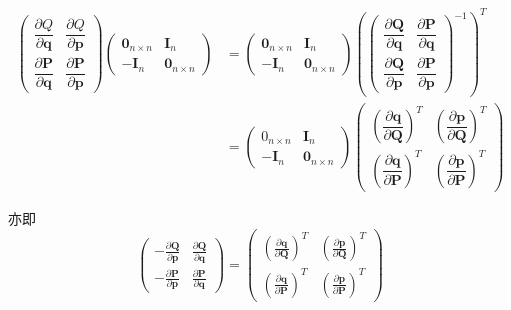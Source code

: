 \documentclass[12pt]{ctexart}
\begin{document}
\begin{equation}
\begin{aligned}\begin{pmatrix}\dfrac{\partial Q}{\partial\boldsymbol{q}}&\dfrac{\partial Q}{\partial\boldsymbol{p}}\\\dfrac{\partial\boldsymbol{P}}{\partial\boldsymbol{q}}&\dfrac{\partial\boldsymbol{P}}{\partial\boldsymbol{p}}\end{pmatrix}\begin{pmatrix}\boldsymbol{0}_{n\times n}&\boldsymbol{I}_n\\-\boldsymbol{I}_n&\boldsymbol{0}_{n\times n}\end{pmatrix}&=\begin{pmatrix}\boldsymbol{0}_{n\times n}&\boldsymbol{I}_n\\-\boldsymbol{I}_n&\boldsymbol{0}_{n\times n}\end{pmatrix}\left(\begin{pmatrix}\dfrac{\partial\boldsymbol{Q}}{\partial\boldsymbol{q}}&\dfrac{\partial\boldsymbol{P}}{\partial\boldsymbol{q}}\\\dfrac{\partial\boldsymbol{Q}}{\partial\boldsymbol{p}}&\dfrac{\partial\boldsymbol{P}}{\partial\boldsymbol{p}}\end{pmatrix}^{-1}\right)^T\\&=\begin{pmatrix}0_{n\times n}&\boldsymbol{I}_n\\-\boldsymbol{I}_n&\boldsymbol{0}_{n\times n}\end{pmatrix}\begin{pmatrix}\left(\dfrac{\partial\boldsymbol{q}}{\partial\boldsymbol{Q}}\right)^T&\left(\dfrac{\partial\boldsymbol{p}}{\partial\boldsymbol{Q}}\right)^T\\\left(\dfrac{\partial\boldsymbol{q}}{\partial\boldsymbol{P}}\right)^T&\left(\dfrac{\partial\boldsymbol{p}}{\partial\boldsymbol{P}}\right)^T\end{pmatrix}\end{aligned}
\label{eq:24}
\end{equation}


亦即
\begin{equation}
    \begin{pmatrix}-\frac{\partial\boldsymbol{Q}}{\partial\boldsymbol{p}}&\frac{\partial\boldsymbol{Q}}{\partial\boldsymbol{q}}\\-\frac{\partial\boldsymbol{P}}{\partial\boldsymbol{p}}&\frac{\partial\boldsymbol{P}}{\partial\boldsymbol{q}}\end{pmatrix}=\begin{pmatrix}\left(\frac{\partial\boldsymbol{q}}{\partial\boldsymbol{Q}}\right)^T&\left(\frac{\partial\boldsymbol{p}}{\partial\boldsymbol{Q}}\right)^T\\\left(\frac{\partial\boldsymbol{q}}{\partial\boldsymbol{P}}\right)^T&\left(\frac{\partial\boldsymbol{p}}{\partial\boldsymbol{P}}\right)^T\end{pmatrix}
    \label{eq:25}
\end{equation}
\end{document}
